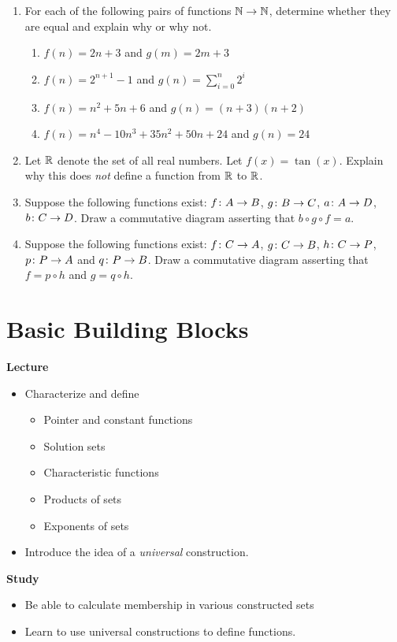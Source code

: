 \begin{exercises}
\begin{enumerate}
\item  For each of the following pairs of functions $\mathbb N\to\mathbb N$, determine whether they are equal and explain why or why not.
  \begin{enumerate}
  \item $f(n) = 2n + 3$ and $g(m) = 2m + 3$
  \item $f(n) = 2^{n+1} - 1$ and $g(n) = \sum_{i=0}^n2^i$
  \item $f(n) =  n^2 + 5n + 6$ and $g(n) = (n+3)(n+2)$
  \item $f(n) = n^4 - 10n^3 + 35n^2 + 50n + 24$ and $g(n) = 24$
  \end{enumerate}
\item Let $\mathbb R$ denote the set of all real numbers. Let $f(x) = \tan(x)$.
Explain why this does \emph{not} define a function from $\mathbb R$ to $\mathbb R$.
\item Suppose the following functions exist: ${f}\colon{A}\to{B}$, ${g}\colon{B}\to{C}$, ${a}\colon{A}\to{D}$, ${b}\colon{C}\to{D}$. 
  Draw a commutative diagram asserting that $b\circ g\circ f = a$.
\item Suppose the following functions exist: ${f}\colon{C}\to{A}$, ${g}\colon{C}\to{B}$, ${h}\colon{C}\to{P}$, ${p}\colon{P}\to{A}$ and ${q}\colon{P}\to{B}$.
 Draw a commutative diagram asserting that $f=p\circ h$ and $g=q\circ h$.
\end{enumerate}
\end{exercises}

\chapter{Basic Building Blocks}

\begin{goals}
	\noindent\textbf{Lecture}
	\begin{itemize}
	\item Characterize and define
		 \begin{itemize}
			 \item Pointer and constant functions
			\item Solution sets
			\item Characteristic functions
			\item Products of sets
			\item Exponents of sets
		 \end{itemize}
	\item Introduce the idea of a \emph{universal} construction.
	\end{itemize}

	\noindent\textbf{Study}
	\begin{itemize}
	\item Be able to calculate membership in various constructed sets 
	\item Learn to use universal constructions to define functions. 
	\end{itemize}
\end{goals}

